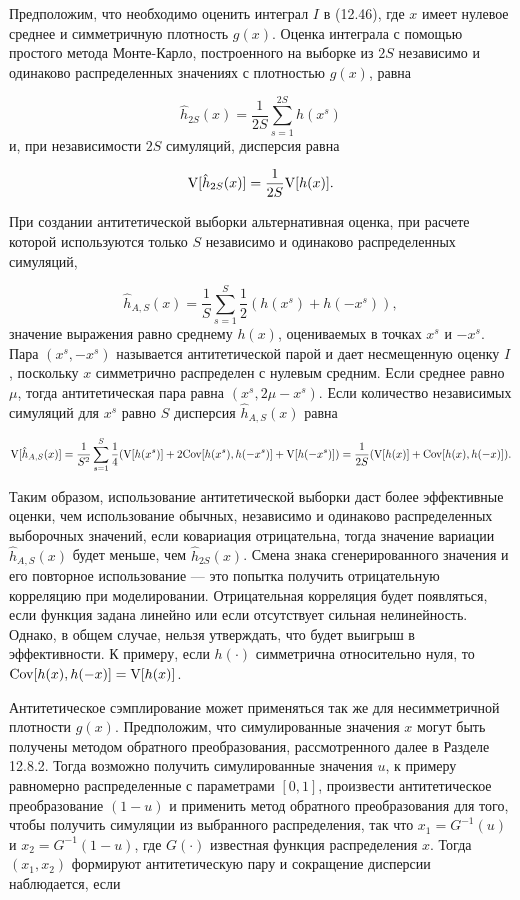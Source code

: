 Предположим, что необходимо оценить интеграл $I$ в (12.46), где $x$ имеет нулевое среднее и симметричную плотность  $g(x)$. Оценка интеграла с помощью простого метода Монте-Карло,  построенного на выборке из $2S$  независимо и одинаково распределенных значениях с плотностью $g(x)$, равна

\[
\hat{h}_{2S}(x)=\dfrac{1}{2S}\sum^{2S}_{s=1}h(x^s)
\]
и, при  независимости $2S$ симуляций, дисперсия равна 

\[
\mathrm{V}[\hat{h}_{2S}(x)]=\dfrac{1}{2S}\mathrm{V}[h(x)].
\]

При создании антитетической выборки альтернативная оценка, при расчете которой используются только $S$ независимо и одинаково распределенных симуляций,

\begin{equation}
\hat{h}_{A,S}(x)=\dfrac{1}{S}\sum^{S}_{s=1}\dfrac{1}{2}(h(x^s)+h(-x^s)),
\end{equation}
значение выражения равно среднему $h(x)$, оцениваемых в точках $x^s$ и $-x^{s}$. Пара $(x^s,-x^s)$ называется антитетической парой и дает несмещенную оценку $I$, поскольку $x$ симметрично распределен с нулевым средним. Если среднее равно $\mu$, тогда антитетическая пара равна $(x^s,2\mu-x^s)$. Если  количество независимых симуляций  для $x^s$  равно $S$ дисперсия $\hat{h}_{A,S}(x)$ равна 

\[
\mathrm{V}[\hat{h}_{A,S}(x)]=\dfrac{1}{S^2}\sum^{S}_{s=1}\dfrac{1}{4}(\mathrm{V}[h(x^s)]+2\mathrm{Cov}[h(x^s),h(-x^s)]+\mathrm{V}[h(-x^s)])=\dfrac{1}{2S}(\mathrm{V}[h(x)]+\mathrm{Cov}[h(x),h(-x)]).
\]

Таким образом, использование антитетической выборки даст более эффективные оценки, чем использование обычных, независимо и одинаково распределенных выборочных значений, если ковариация отрицательна, тогда значение вариации $\hat{h}_{A,S}(x)$ будет меньше, чем $\hat{h}_{2S}(x)$. Смена знака сгенерированного значения и его повторное использование --- это попытка получить отрицательную корреляцию при моделировании. Отрицательная корреляция будет появляться, если функция задана линейно или если отсутствует сильная нелинейность. Однако, в общем случае, нельзя утверждать, что будет выигрыш в  эффективности. К примеру, если $h(\cdot)$ симметрична относительно нуля, то $\mathrm{Cov}[h(x),h(-x)]=\mathrm{V}[h(x)]$.

Антитетическое сэмплирование может применяться так же для несимметричной плотности $g(x)$. Предположим, что симулированные значения $x$ могут быть получены методом обратного преобразования, рассмотренного далее в Разделе 12.8.2. Тогда возможно получить симулированные значения $u$, к примеру равномерно распределенные с параметрами $[0,1]$, произвести антитетическое преобразование $(1-u)$ и применить метод обратного преобразования для того, чтобы получить симуляции из выбранного распределения, так что $x_1=G^{-1}(u)$ и $x_2=G^{-1}(1-u)$, где $G(\cdot)$ известная  функция распределения $x$. Тогда $(x_1,x_2)$ формируют антитетическую пару и сокращение дисперсии наблюдается, если

